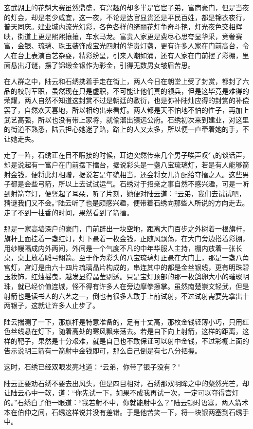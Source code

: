 玄武湖上的花魁大赛虽然鼎盛，有兴趣的却多半是官宦子弟，富商豪门，但是当夜的灯会，却是老少咸宜，这一夜，不论是达官显贵还是平民百姓，都是锦衣夜行，普天同庆。建业城内流光幻彩，各色各样的绮丽花灯争奇斗艳，灯光夜色交相辉映，街道上更是熙熙攘攘，车水马龙。富贵人家更是费尽心思夸显华采，竞奢赛富，金银、琉璃、珠玉装饰成宝光四射的华贵灯盏，更有许多人家在门前高台，令人在台上表演百艺杂耍，精彩纷呈，引来人潮如涌，还有人家在门前摆了彩棚，里面悬出灯谜，摆了锦缎金银作为彩金，引得无数男女皱眉苦思。

在人群之中，陆云和石绣携着手走在街上，两人今日在朝堂上受了封赏，都封了六品的校尉军职，虽然现在只是虚职，不可能让他们真的领兵，但是这毕竟是难得的荣耀，两人自然不知道这封赏不过是朝廷的敷衍，也是弥补陆灿应得的封赏的补偿罢了，自然欢天喜地，所以相约出来看灯。两人都是天不怕地不怕的性子，再加上武艺高强，所以也没有带上家将，就偷溜出镇远公府。石绣初次来到建业，对这里的街道不熟悉，陆云担心她迷了路，路上的人又太多，所以便一直牵着她的手，不让她走失。

走了一阵，石绣正在目不暇接的时候，耳边突然传来几个男子唉声叹气的谈话声，却是说起有一富户在门前摆下擂台，据说彩头是一盏八宝琉璃灯，若是有人能够箭射金钱，便将此灯相赠，据说若是年貌相当，还会将女儿许配给夺擂之人。这些男子都是会些弓箭，所以上去试试运气。石绣对于招亲之事自然不感兴趣，可是一听到射箭夺灯，便竖起了耳朵，听了片刻，她便对陆云道：“云弟，我们去试试吧，猜谜我们又不会。”陆云听了也是颇感兴趣，便带着石绣向那些人所说的方向走去。走了不到一拄香的时间，果然看到了箭擂。

那是一家高墙深户的豪门，门前辟出一块空地，距离大门百步之外树着一根旗杆，旗杆上面挂着一盏红灯，灯下悬着一枚金钱，正随风飘荡，在大门旁边搭着彩棚，用纱幔隔成内外两间，外间是一个气度不凡的中年华服人主持，棚内放着一张长桌，桌上放着雕弓翎箭。至于作为彩头的八宝琉璃灯正悬在大门上，那是一盏八角宫灯，宫灯是由六十四片琉璃晶片构成的，串连其中的都是金丝银线，更有明珠碧玉妆饰，红烛摇曳，越发显得晶莹剔透。只是宝灯顶部的那一枚鸽卵大小的璀璨明珠，就已经价值连城，怪不得有许多人在旁边摩拳擦掌。虽然南楚崇文轻武，但是射箭也是读书人的六艺之一，倒也有很多人敢于上前试射，不过试射需要先拿出十两银子，这就让许多人止步了。

陆云揣测了一下，那旗杆是特意准备的，足有十丈高，那枚金钱轻薄小巧，只用红色丝线悬在灯下，随着高处的寒风飘来荡去。若是自下向上射箭，这样的距离，这样的靶子，果然是十分艰难，就是自己也不敢保证可以射中金钱，不过彩棚上面的告示说明三箭有一箭射中金钱即可，那么自己倒是有七八分把握。

这时，石绣已经双眼发亮地道：“云弟，你带了银子没有？”

陆云正要劝石绣不要去出风头，但是四目相对，石绣那双明眸之中的粲然光芒，却让陆云心中一软，道：“你先试一下，如果不成我再试一次，一定可以夺得宫灯的。”石绣白了他一眼道：“我若射不中，你就能射中么？”陆云顿时语塞，两人箭术本在伯仲之间，石绣这样说并没有差错。于是他苦笑一下，将一块银两塞到石绣手中。

